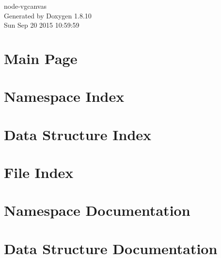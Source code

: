 \documentclass[twoside]{book}
\newcommand{\+}{\discretionary{\mbox{\scriptsize$\hookleftarrow$}}{}{}}
\newcommand{\clearemptydoublepage}{%
  \newpage{\pagestyle{empty}\cleardoublepage}%
}
\begin{document}
\hypersetup{pageanchor=false,
             bookmarks=true,
             bookmarksnumbered=true,
             pdfencoding=unicode
            }
\begin{titlepage}
\vspace*{7cm}
\begin{center}%
{\Large node-\/vgcanvas }\\
\vspace*{1cm}
{\large Generated by Doxygen 1.8.10}\\
\vspace*{0.5cm}
{\small Sun Sep 20 2015 10:59:59}\\
\end{center}
\end{titlepage}
\clearemptydoublepage
\tableofcontents
\clearemptydoublepage
{}
\hypersetup{pageanchor=true}

\chapter{Main Page}
\label{index}\hypertarget{index}{}
\chapter{Namespace Index}

\chapter{Data Structure Index}

\chapter{File Index}

\chapter{Namespace Documentation}

\chapter{Data Structure Documentation}




\end{document}
